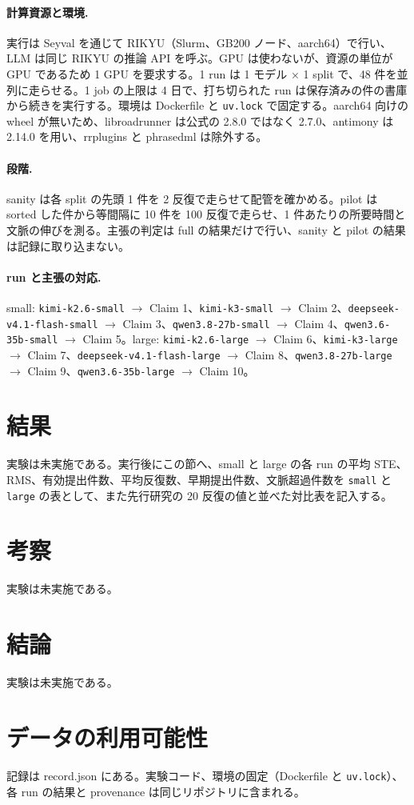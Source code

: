 \documentclass{article}
\providecommand{\airasrecordlink}[1]{#1}
\begin{document}
\paragraph{計算資源と環境.}
実行は Seyval を通じて RIKYU（Slurm、GB200 ノード、aarch64）で行い、LLM は同じ RIKYU の推論 API を呼ぶ。GPU は使わないが、資源の単位が GPU であるため 1 GPU を要求する。1 run は 1 モデル × 1 split で、48 件を並列に走らせる。1 job の上限は 4 日で、打ち切られた run は保存済みの件の書庫から続きを実行する。環境は Dockerfile と \texttt{uv.lock} で固定する。aarch64 向けの wheel が無いため、libroadrunner は公式の 2.8.0 ではなく 2.7.0、antimony は 2.14.0 を用い、rrplugins と phrasedml は除外する。

\paragraph{段階.}
sanity は各 split の先頭 1 件を 2 反復で走らせて配管を確かめる。pilot は sorted した件から等間隔に 10 件を 100 反復で走らせ、1 件あたりの所要時間と文脈の伸びを測る。主張の判定は full の結果だけで行い、sanity と pilot の結果は記録に取り込まない。

\paragraph{run と主張の対応.}
small: \texttt{kimi-k2.6-small} $\to$ Claim 1、\texttt{kimi-k3-small} $\to$ Claim 2、\texttt{deepseek-v4.1-flash-small} $\to$ Claim 3、\texttt{qwen3.8-27b-small} $\to$ Claim 4、\texttt{qwen3.6-35b-small} $\to$ Claim 5。large: \texttt{kimi-k2.6-large} $\to$ Claim 6、\texttt{kimi-k3-large} $\to$ Claim 7、\texttt{deepseek-v4.1-flash-large} $\to$ Claim 8、\texttt{qwen3.8-27b-large} $\to$ Claim 9、\texttt{qwen3.6-35b-large} $\to$ Claim 10。


\section{結果}
\label{sec:results}
実験は未実施である。実行後にこの節へ、small と large の各 run の平均 STE、RMS、有効提出件数、平均反復数、早期提出件数、文脈超過件数を \texttt{small} と \texttt{large} の表として、また先行研究の 20 反復の値と並べた対比表を記入する。

\section{考察}
\label{sec:discussion}
実験は未実施である。

\section{結論}
\label{sec:conclusion}
実験は未実施である。

\section*{データの利用可能性}
記録は \airasrecordlink{record.json} にある。実験コード、環境の固定（Dockerfile と \texttt{uv.lock}）、各 run の結果と provenance は同じリポジトリに含まれる。



\end{document}
